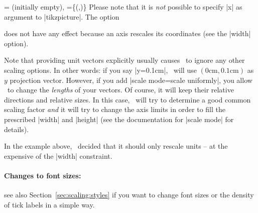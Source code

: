 \begin{pgfplotsxykeylist}{
	\x= (initially empty),
	\x={\{(,)\}}}
	Please note that it is \emph{not} possible to specify |x| as argument to |tikzpicture|. The option 
\begin{codeexample}
\end{codeexample}
	does not have any effect because an axis rescales its coordinates (see the |width| option).

	Note that providing unit vectors explicitly usually causes \PGFPlots\ to ignore any other scaling options. In other words: if you say |y=0.1cm|, \PGFPlots\ will use $(0\text{cm},0.1\text{cm})$ as $y$ projection vector. However, if you add |scale mode=scale uniformly|, you allow \PGFPlots\ to change the \emph{lengths} of your vectors. Of course, it will keep their relative directions and relative sizes. In this case, \PGFPlots\ will try to determine a good common scaling factor \emph{and} it will try to change the axis limits in order to fill the prescribed |width| and |height| (see the documentation for |scale mode| for details).
\begin{codeexample}[]
\end{codeexample}
	\noindent In the example above, \PGFPlots\ decided that it should only rescale units -- at the expensive of the |width| constraint.

\paragraph{Changes to font sizes:} see also Section~\ref{sec:scaling:styles} if you want to change font sizes or the density of tick labels in a simple way.


\end{pgfplotsxykeylist}
